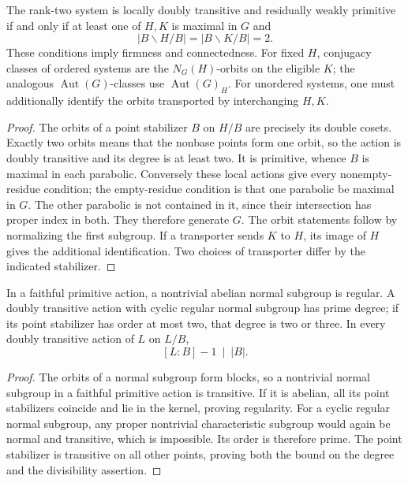 \documentclass[11pt,a4paper]{article}
\newcommand{\Aut}{\operatorname{Aut}}\newcommand{\F}{\mathbb F}
\begin{document}
\begin{lemma}\label{local}
The rank-two system is locally doubly transitive and residually weakly
primitive if and only if at least one of $H,K$ is maximal in $G$ and
\[
 |B\backslash H/B|=|B\backslash K/B|=2.
\]
These conditions imply firmness and connectedness. For fixed $H$, conjugacy
classes of ordered systems are the $N_G(H)$-orbits on the eligible $K$;
the analogous $\Aut(G)$-classes use $\Aut(G)_H$. For unordered systems,
one must additionally identify the orbits transported by interchanging $H,K$.
\end{lemma}
\begin{proof}
The orbits of a point stabilizer $B$ on $H/B$ are precisely its double
cosets. Exactly two orbits means that the nonbase points form one orbit,
so the action is doubly transitive and its degree is at least two. It is
primitive, whence $B$ is maximal in each parabolic. Conversely these local
actions give every nonempty-residue condition; the empty-residue condition
is that one parabolic be maximal in $G$. The other parabolic is not contained
in it, since their intersection has proper index in both. They therefore
generate $G$. The orbit statements follow by normalizing the first subgroup.
If a transporter sends $K$ to $H$, its image of $H$ gives the additional
identification. Two choices of transporter differ by the indicated stabilizer.
\end{proof}

\begin{lemma}\label{primitive}
In a faithful primitive action, a nontrivial abelian normal subgroup is
regular. A doubly transitive action with cyclic regular normal subgroup has
prime degree; if its point stabilizer has order at most two, that degree
is two or three. In every doubly transitive action of $L$ on $L/B$,
\[
 [L:B]-1\ \mid\ |B|.
\]
\end{lemma}
\begin{proof}
The orbits of a normal subgroup form blocks, so a nontrivial normal subgroup
in a faithful primitive action is transitive. If it is abelian, all its point
stabilizers coincide and lie in the kernel, proving regularity. For a cyclic
regular normal subgroup, any proper nontrivial characteristic subgroup would
again be normal and transitive, which is impossible. Its order is therefore
prime. The point stabilizer is transitive on all other points, proving both
the bound on the degree and the divisibility assertion.
\end{proof}
\end{document}
